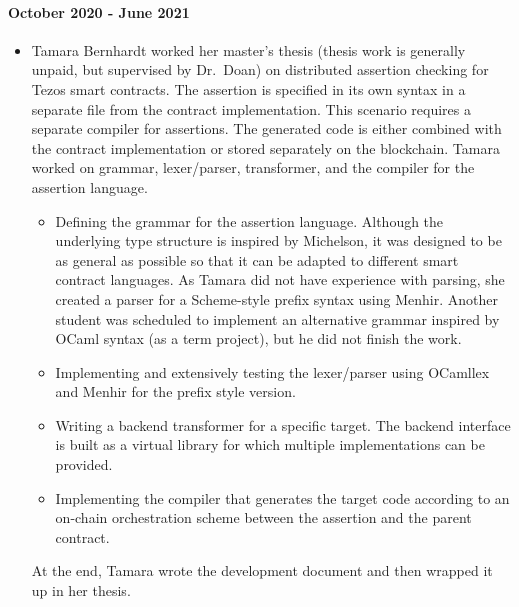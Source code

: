 \documentclass[a4paper,11pt]{article}
\begin{document}
\paragraph{October 2020 - June 2021}
\begin{itemize}
\item Tamara Bernhardt worked her master's thesis (thesis work is generally unpaid, but supervised by Dr.\ Doan) on distributed  assertion checking for Tezos smart contracts. The assertion is specified in its own syntax in a separate file from the contract implementation. This scenario requires a separate compiler for assertions.  The generated code is either combined with the contract implementation or stored separately on the blockchain. Tamara worked on grammar, lexer/parser, transformer, and the compiler for the assertion language. 
\begin{itemize}
\item Defining the grammar for the assertion language. Although the underlying type structure is inspired by Michelson, it was designed to be as general as possible so that it can be adapted to different smart contract languages. As Tamara did not have  experience with parsing, she created a parser for a Scheme-style prefix syntax using Menhir. Another student was scheduled  to implement an alternative grammar inspired by OCaml syntax (as a term project), but he did not finish the work.
\item Implementing and extensively testing the lexer/parser using OCamllex and Menhir for the prefix style version.
\item Writing a backend transformer for a specific target. The backend interface is built as a virtual library for which multiple  implementations can be provided.
\item Implementing the compiler that generates the target code according to an on-chain orchestration scheme between the assertion and the parent contract.
\end{itemize}
At the end, Tamara wrote the development document and then wrapped it up in her thesis.
\end{itemize}
\end{document}
